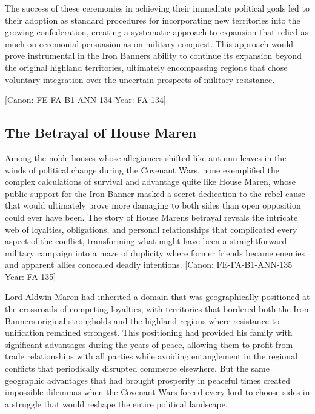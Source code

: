 The success of these ceremonies in achieving their immediate political
goals led to their adoption as standard procedures for incorporating new
territories into the growing confederation, creating a systematic
approach to expansion that relied as much on ceremonial persuasion as on
military conquest. This approach would prove instrumental in the Iron
Banner\textquotesingle s ability to continue its expansion beyond the
original highland territories, ultimately encompassing regions that
chose voluntary integration over the uncertain prospects of military
resistance.

{[}Canon: FE-FA-B1-ANN-134 \textbar{} Year: FA 134{]}

\subsection{The Betrayal of House
Maren}\label{the-betrayal-of-house-maren}

Among the noble houses whose allegiances shifted like autumn leaves in
the winds of political change during the Covenant Wars, none exemplified
the complex calculations of survival and advantage quite like House
Maren, whose public support for the Iron Banner masked a secret
dedication to the rebel cause that would ultimately prove more damaging
to both sides than open opposition could ever have been. The story of
House Maren\textquotesingle s betrayal reveals the intricate web of
loyalties, obligations, and personal relationships that complicated
every aspect of the conflict, transforming what might have been a
straightforward military campaign into a maze of duplicity where former
friends became enemies and apparent allies concealed deadly intentions.
{[}Canon: FE-FA-B1-ANN-135 \textbar{} Year: FA 135{]}

Lord Aldwin Maren had inherited a domain that was geographically
positioned at the crossroads of competing loyalties, with territories
that bordered both the Iron Banner\textquotesingle s original
strongholds and the highland regions where resistance to unification
remained strongest. This positioning had provided his family with
significant advantages during the years of peace, allowing them to
profit from trade relationships with all parties while avoiding
entanglement in the regional conflicts that periodically disrupted
commerce elsewhere. But the same geographic advantages that had brought
prosperity in peaceful times created impossible dilemmas when the
Covenant Wars forced every lord to choose sides in a struggle that would
reshape the entire political landscape.

